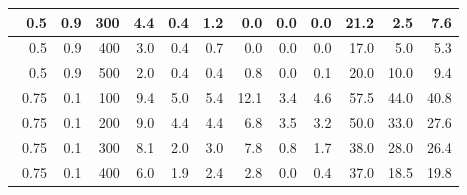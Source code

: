 \begin{longtable}{|r|r|r|r|r|r|r|r|r|r|r|r|}
    \hline \
    0.5                            & 0.9                     & 300                       & 4.4                       & 0.4                       & 1.2                       & 0.0                       & 0.0                       & 0.0                       & 21.2                      & 2.5                      & 7.6                       \\
    \hline \
    0.5                           & 0.9                     & 400                       & 3.0                       & 0.4                       & 0.7                       & 0.0                      & 0.0                       & 0.0                       & 17.0                      & 5.0                      & 5.3                      \\
    \hline \
    0.5                           & 0.9                     & 500                       & 2.0                       & 0.4                       & 0.4                       & 0.8                       & 0.0                       & 0.1                       & 20.0                      & 10.0                      & 9.4                      \\
    \hline \
    0.75                           & 0.1                     & 100                       & 9.4                       & 5.0                       & 5.4                       & 12.1                       & 3.4                       & 4.6                       & 57.5                      & 44.0                      & 40.8                      \\
    \hline \
    0.75                           & 0.1                     & 200                       & 9.0                       & 4.4                       & 4.4                       & 6.8                       & 3.5                       & 3.2                       & 50.0                      & 33.0                      & 27.6                      \\
    \hline \
    0.75                           & 0.1                     & 300                       & 8.1                       & 2.0                       & 3.0                       & 7.8                       & 0.8                       & 1.7                       & 38.0                      & 28.0                      & 26.4                      \\
    \hline \
    0.75                           & 0.1                    & 400                       & 6.0                      & 1.9                       & 2.4                       & 2.8                      & 0.0                       & 0.4                       & 37.0                      & 18.5                      & 19.8                      \\

\end{longtable}
